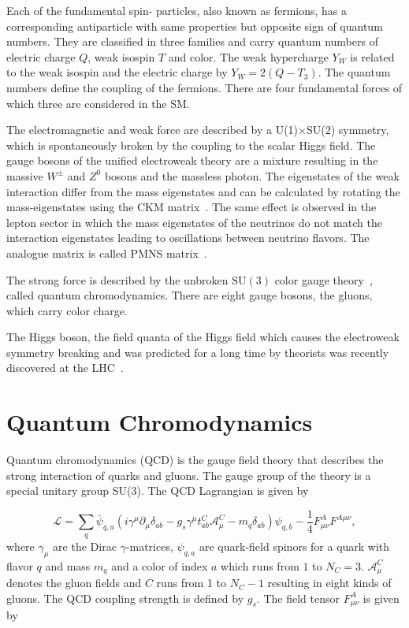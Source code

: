 Each of the fundamental spin- particles, also known as fermions,
has a corresponding antiparticle with same properties but opposite sign of
quantum numbers. They are classified in three families and carry quantum numbers
of electric charge $Q$, weak isospin $T$ and color. The weak hypercharge $Y_W$
is related to the weak isospin and the electric charge by $Y_W = 2(Q-T_3)$. The
quantum numbers define the coupling of the fermions. There are four fundamental
forces of which three are considered in the SM.

The electromagnetic and weak force are described by a U(1)$\times$SU(2)
symmetry, which is spontaneously broken by the coupling to the scalar Higgs
field. The gauge bosons of the unified electroweak theory are a mixture
resulting in the massive $W^\pm$ and $Z^0$ bosons and the massless photon. The
eigenstates of the weak interaction differ from the mass eigenstates and can be
calculated by rotating the mass-eigenstates using the CKM
matrix~\cite{Cabibbo:1963yz,Kobayashi:1973fv}. The same effect is observed in
the lepton sector in which the mass eigenstates of the neutrinos do not match
the interaction eigenstates leading to oscillations between neutrino flavors.
The analogue matrix is called PMNS matrix~\cite{Maki:1962mu,Pontecorvo:1957qd}.

The strong force is described by the unbroken $\mathrm{SU}(3)$ color gauge
theory~\cite{Zweig:1981pd,Fritzsch:1973pi}, called quantum chromodynamics. There
are eight gauge bosons, the gluons, which carry color charge. 

The Higgs boson, the field quanta of the Higgs field which causes the
electroweak symmetry breaking and was predicted for a long time by theorists was
recently discovered at the LHC~\cite{Chatrchyan:2012xdj,Aad:2012tfa}.

\section{Quantum Chromodynamics}

Quantum chromodynamics (QCD) is the gauge field theory that describes the
strong interaction of quarks and gluons. The gauge group of the theory is a
special unitary group SU(3). The QCD Lagrangian is given by

\begin{equation*}
   \mathcal{L} = \sum_q \bar \psi_{q,a} \left( i \gamma^\mu \partial_\mu
   \delta_{ab} - g_s \gamma^\mu t_{ab}^C \mathcal{A}_{\mu}^C - m_q \delta_{ab}
   \right) \psi_{q,b} - \frac{1}{4} F_{\mu\nu}^{A} F^{A \mu\nu},
\end{equation*}
%
where $\gamma_\mu$ are the Dirac $\gamma$-matrices, $\psi_{q,a}$ are
quark-field spinors for a quark with flavor $q$ and mass $m_q$ and a color of
index $a$ which runs from $1$ to $N_C=3$. $\mathcal{A}_\mu^C$ denotes the gluon
fields and $C$ runs from 1 to $N_C-1$ resulting in eight kinds of gluons. The
QCD coupling strength is defined by $g_s$. The field tensor $F_{\mu\nu}^A$ is
given by

